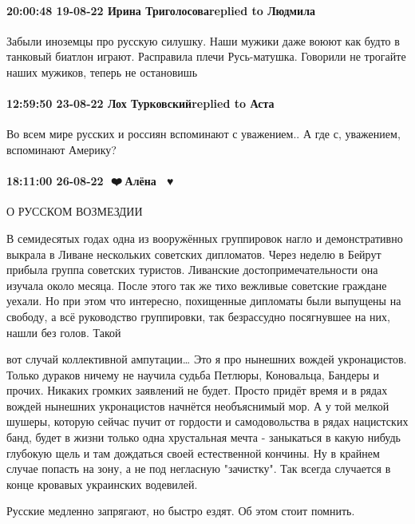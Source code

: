 \paragraph{20:00:48 19-08-22 Ирина Триголосоваreplied to Людмила}

Забыли иноземцы про русскую силушку. Наши мужики даже воюют как будто в
танковый биатлон играют. Расправила плечи Русь-матушка. Говорили не трогайте
наших мужиков, теперь не остановишь

\paragraph{12:59:50 23-08-22 Лох Турковскийreplied to Аста}

Во всем мире русских и россиян вспоминают с уважением.. А где с, уважением,
вспоминают Америку?

\paragraph{18:11:00 26-08-22 🖤❤️💛Алёна 🤍💙♥️}

О РУССКОМ ВОЗМЕЗДИИ

В семидесятых годах одна из вооружённых группировок нагло и демонстративно
выкрала в Ливане нескольких советских дипломатов. Через неделю в Бейрут прибыла
группа советских туристов. Ливанские достопримечательности она изучала около
месяца. После этого так же тихо вежливые советские граждане уехали. Но при этом
что интересно, похищенные дипломаты были выпущены на свободу, а всё руководство
группировки, так безрассудно посягнувшее на них, нашли без голов. Такой

вот случай коллективной ампутации… Это я про нынешних вождей укронацистов.
Только дураков ничему не научила судьба Петлюры, Коновальца, Бандеры и прочих.
Никаких громких заявлений не будет. Просто придёт время и в рядах вождей
нынешних укронацистов начнётся необъяснимый мор. А у той мелкой шушеры, которую
сейчас пучит от гордости и самодовольства в рядах нацистских банд, будет в
жизни только одна хрустальная мечта - заныкаться в какую нибудь глубокую щель и
там дождаться своей естественной кончины. Ну в крайнем случае попасть на зону,
а не под негласную "зачистку". Так всегда случается в конце кровавых украинских
водевилей.

Русские медленно запрягают, но быстро ездят. Об этом стоит помнить.

